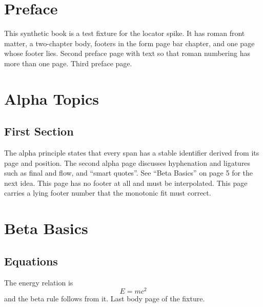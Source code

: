 \documentclass[11pt,oneside]{book}
\begin{document}
\frontmatter
\chapter{Preface}
This synthetic book is a test fixture for the locator spike. It has roman front matter, a two-chapter body, footers in the form page bar chapter, and one page whose footer lies.
\newpage Second preface page with text so that roman numbering has more than one page.
\newpage Third preface page.
\mainmatter
\chapter{Alpha Topics}
\section{First Section}
The alpha principle states that every span has a stable identifier derived from its page and position.
\newpage
The second alpha page discusses hyphen\-ation and ligatures such as ﬁnal and ﬂow, and “smart quotes”.
See ``Beta Basics'' on page 5 for the next idea.
\newpage
\thispagestyle{empty}
This page has no footer at all and must be interpolated.
\newpage
{}
This page carries a lying footer number that the monotonic fit must correct.
\newpage
\fancyfoot[R]{\rightmark\ $|$\ \thepage}
\chapter{Beta Basics}
\section{Equations}
The energy relation is
\begin{equation} E = mc^2 \end{equation}
and the beta rule follows from it.
\newpage
Last body page of the fixture.
\end{document}
